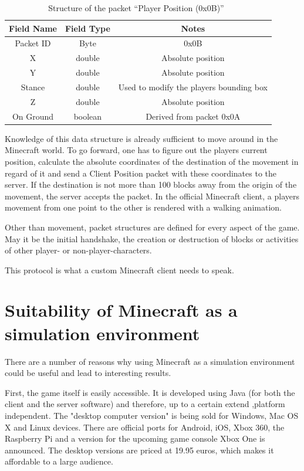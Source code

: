 \begin{table}[htb]
\centering
\begin{tabular}{|c|c|c|}\hline

    Field Name & Field Type & Notes \\ \hline
   Packet ID & Byte & 0x0B \\ \hline
   X & double & Absolute position \\ \hline
   Y & double & Absolute position \\ \hline
   Stance & double & Used to modify the players bounding box \\ \hline
   Z & double & Absolute position \\ \hline
   On Ground & boolean & Derived from packet 0x0A \\ \hline
   
\end{tabular}
\caption{Structure of the packet ``Player Position (0x0B)''~\cite{protocol}}
\label{mc_packet}
\end{table}

Knowledge of this data structure is already sufficient to move around in the Minecraft world. To go forward, one has to figure out the players current position, calculate the absolute coordinates of the destination of the movement in regard of it and send a Client Position packet with these coordinates to the server. If the destination is not more than 100 blocks away from the origin of the movement, the server accepts the packet. In the official Minecraft client, a players movement from one point to the other is rendered with a walking animation.

Other than movement, packet structures are defined for every aspect of the game. May it be the initial handshake, the creation or destruction of blocks or activities of other player- or non-player-characters.

This protocol is what a custom Minecraft client needs to speak.

        \section{Suitability of Minecraft as a simulation environment}
There are a number of reasons why using Minecraft as a simulation environment could be useful and lead to interesting results.

First, the game itself is easily accessible. It is developed using Java (for both the client and the server software) and therefore, up to a certain extend ,platform independent. The "desktop computer version" is being sold for Windows, Mac OS X and Linux devices. There are official ports for Android, iOS, Xbox 360, the Raspberry Pi and a version for the upcoming game console Xbox One is announced. The desktop versions are priced at 19.95 euros, which makes it affordable to a large audience.

